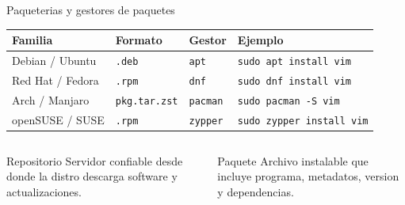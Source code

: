 \documentclass[aspectratio=169]{beamer}
\begin{document}
\begin{frame}{Paqueterias y gestores de paquetes}
  \small
  \begin{center}
  \begin{tabular}{p{} p{} p{} p{}}
    \toprule
    Familia & Formato & Gestor & Ejemplo \\
    \midrule
    Debian / Ubuntu & \texttt{.deb} & \texttt{apt} & \texttt{sudo apt install vim} \\
    Red Hat / Fedora & \texttt{.rpm} & \texttt{dnf} & \texttt{sudo dnf install vim} \\
    Arch / Manjaro & \texttt{pkg.tar.zst} & \texttt{pacman} & \texttt{sudo pacman -S vim} \\
    openSUSE / SUSE & \texttt{.rpm} & \texttt{zypper} & \texttt{sudo zypper install vim} \\
    \bottomrule
  \end{tabular}
  \end{center}
  \vspace{0.25cm}
  \begin{columns}[t]
    \begin{block}{Repositorio}
      \small Servidor confiable desde donde la distro descarga software y actualizaciones.
    \end{block}
    \begin{exampleblock}{Paquete}
      \small Archivo instalable que incluye programa, metadatos, version y dependencias.
    \end{exampleblock}
  \end{columns}
\end{frame}
\end{document}
